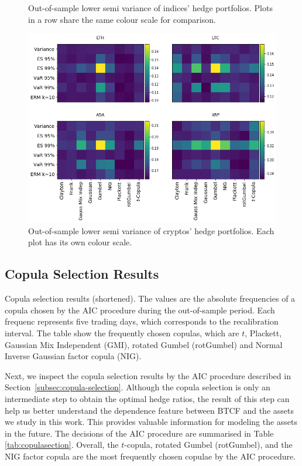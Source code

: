 \begin{landscape}
\begin{figure}[h]
\begin{minipage}[b]{0.475\linewidth}
    \caption{Out-of-sample lower semi variance of indices' hedge portfolios. Plots in a row share the same colour scale for comparison.}
    \label{SLV_cryptos}
  \end{minipage}
    \hfill
  \begin{minipage}[b]{0.475\linewidth}
    \centering
    \includegraphics[height=.5\linewidth]{_pics/semiVariance_cryptos.png}
    \caption{Out-of-sample lower semi variance of cryptos' hedge portfolios. Each plot has its own colour scale.}
    \label{SLV_indices}
  \end{minipage}
\end{figure}
\end{landscape}

\subsection{Copula Selection Results}\label{subsec:-copula-results}
\begin{table}[t]

 \caption{Copula selection results (shortened).
        The values are the absolute frequencies of a copula chosen by
        the AIC procedure during the out-of-sample period. 
        Each frequenc represents five trading days, which corresponds
        to the recalibration interval.
        The table show the frequently chosen copulas, which are
        $t$, Plackett, Gaussian Mix Independent (GMI), rotated Gumbel
        (rotGumbel) and Normal Inverse Gaussian factor copula (NIG). 
        }
    \label{tab:copulasection}
\end{table}
Next, we inspect the copula selection results by the AIC procedure
described in Section~\ref{subsec:copula-selection}. 
Although the copula selection is only an intermediate step to obtain
the optimal hedge ratios,
the result of this step can help us better understand the dependence
feature between BTCF and the assets we study in this work.
This provides valuable information for modeling the assets in the future.
The decisions of the AIC procedure are summarised in Table
\ref{tab:copulasection}. Overall, the $t$-copula, rotated Gumbel
(rotGumbel), and the NIG factor copula are the most frequently chosen
copulae by the AIC procedure.

